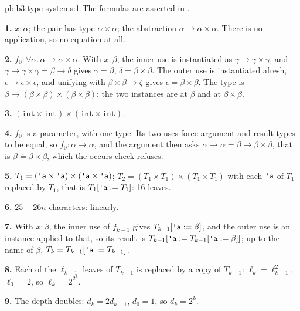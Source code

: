 \begin{solution}{pb:b3:type-systems:1}
The formulas are asserted in .

\textbf{1.} $x : \alpha$; the pair has type $\alpha \times \alpha$; the abstraction $\alpha \to \alpha \times \alpha$. There is no application, so no equation at all.

\textbf{2.} $f_0 : \forall \alpha.\,\alpha \to \alpha \times \alpha$. With $x : \beta$, the inner use is instantiated as $\gamma \to \gamma \times \gamma$, and $\gamma \to \gamma \times \gamma \doteq \beta \to \delta$ gives $\gamma = \beta$, $\delta = \beta \times \beta$. The outer use is instantiated afresh, $\epsilon \to \epsilon \times \epsilon$, and unifying with $\beta \times \beta \to \zeta$ gives $\epsilon = \beta \times \beta$. The type is $\beta \to (\beta \times \beta) \times (\beta \times \beta)$: the two instances are at $\beta$ and at $\beta \times \beta$.

\textbf{3.} $(\mathtt{int} \times \mathtt{int}) \times (\mathtt{int} \times \mathtt{int})$.

\textbf{4.} $f_0$ is a parameter, with one type. Its two uses force argument and result types to be equal, so $f_0 : \alpha \to \alpha$, and the argument then asks $\alpha \to \alpha \doteq \beta \to \beta \times \beta$, that is $\beta \doteq \beta \times \beta$, which the occurs check refuses.

\textbf{5.} $T_1 = (\text{\ttfamily\textquotesingle a} \times \text{\ttfamily\textquotesingle a}) \times (\text{\ttfamily\textquotesingle a} \times \text{\ttfamily\textquotesingle a})$; $T_2 = (T_1 \times T_1) \times (T_1 \times T_1)$ with each $\text{\ttfamily\textquotesingle a}$ of $T_1$ replaced by $T_1$, that is $T_1[\text{\ttfamily\textquotesingle a} := T_1]$: 16 leaves.

\textbf{6.} $25 + 26n$ characters: linearly.

\textbf{7.} With $x : \beta$, the inner use of $f_{k-1}$ gives $T_{k-1}[\text{\ttfamily\textquotesingle a} := \beta]$, and the outer use is an instance applied to that, so its result is $T_{k-1}[\text{\ttfamily\textquotesingle a} := T_{k-1}[\text{\ttfamily\textquotesingle a} := \beta]]$; up to the name of $\beta$, $T_k = T_{k-1}[\text{\ttfamily\textquotesingle a} := T_{k-1}]$.

\textbf{8.} Each of the $\ell_{k-1}$ leaves of $T_{k-1}$ is replaced by a copy of $T_{k-1}$: $\ell_k = \ell_{k-1}^2$, $\ell_0 = 2$, so $\ell_k = 2^{2^k}$.

\textbf{9.} The depth doubles: $d_k = 2d_{k-1}$, $d_0 = 1$, so $d_k = 2^k$.


\end{solution}
